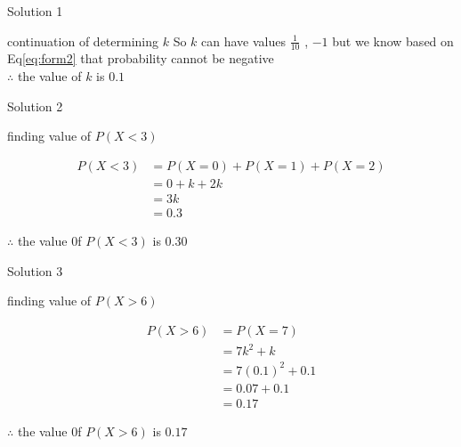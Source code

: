 \documentclass{beamer}
\providecommand{\brak}[1]{\ensuremath{\left(#1\right)}}
\begin{document}
\begin{frame}{Solution 1}

       \begin{block}{continuation of determining $k$}
                               So $k$ can have values $\frac{1}{10}$ , $-1$ but we know based on Eq\eqref{eq:form2} that probability cannot be negative \\
                               $\therefore$ the value of $k$ is $0.1$
       \end{block}

\end{frame}



\begin{frame}{Solution 2}

       \begin{block}{finding value of $P(X < 3)$}
       
                \begin{align}
                    P(X < 3 ) &= P(X = 0 ) + P(X = 1 ) + P(X = 2 ) \\
                              &= 0 + k + 2k \\
                              &= 3k \\
                              &= 0.3 
                \end{align}
                
                $\therefore$ the value 0f $P(X < 3 )$ is $0.30$
       \end{block}

\end{frame}



\begin{frame}{Solution 3}

       \begin{block}{finding value of $P(X > 6)$}
       
                \begin{align}
                    P(X > 6 ) &= P(X = 7 )  \\
                              &= 7k^{2} + k \\
                              &= 7\brak{0.1}^{2} + 0.1 \\
                              &= 0.07 + 0.1 \\
                              &= 0.17 
                \end{align}
                
                $\therefore$ the value 0f $P(X > 6 )$ is $0.17$
       \end{block}

\end{frame}
\end{document}
